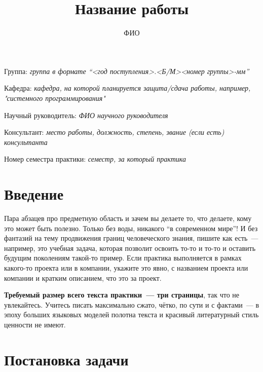 \documentclass[a4paper]{article}
\title{Название работы}
\author{ФИО}
\date{}
\begin{document}
\maketitle

\begin{flushright}
    Группа: \emph{группа в формате \enquote{<год поступления>.<Б/М><номер группы>-мм}}

    Кафедра: \emph{кафедра, на которой планируется защита/сдача работы, например, "системного программирования"}

    Научный руководитель: \emph{ФИО научного руководителя}

    Консультант: \emph{место работы, должность, степень, звание (если есть) консультанта}
    
    Номер семестра практики: \emph{семестр, за который практика}
\end{flushright} 

\section{Введение}

Пара абзацев про предметную область и зачем вы делаете то, что делаете, кому это может быть полезно. Только без воды, никакого \enquote{в современном мире}! И без фантазий на тему продвижения границ человеческого знания, пишите как есть~---например, это учебная задача, которая позволит освоить то-то и то-то и оставить будущим поколениям такой-то пример. Если практика выполняется в рамках какого-то проекта или в компании, укажите это явно, с названием проекта или компании и кратким описанием, что это за проект.

\textbf{Требуемый размер всего текста практики~--- три страницы}, так что не увлекайтесь. Учитесь писать максимально сжато, чётко, по сути и с фактами~--- в эпоху больших языковых моделей полотна текста и красивый литературный стиль ценности не имеют.

\section{Постановка задачи}
\end{document}
